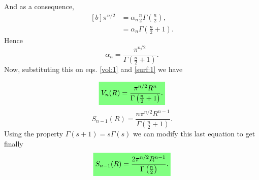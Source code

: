 \begin{questions}
\begin{solution}
\begin{equation}
  \end{equation}
  And as a consequence,
  \begin{equation}
    \begin{aligned}[b]
      \pi^{n/2} &= \alpha_n \frac{n}{2} \Gamma \left(\frac{n}{2}\right),\\
      & = \alpha_n \Gamma \left(\frac{n}{2} + 1 \right).
    \end{aligned}
  \end{equation}
  Hence
  \begin{equation}
    \alpha_n = \frac{\pi^{n/2}}{\Gamma \left(\frac{n}{2} + 1 \right)}.
  \end{equation}
  Now, substituting this on eqs. \ref{vol:1} and \ref{surf:1} we have

  \begin{equation}
    \hlgreen{V_n(R) = \frac{\pi^{n/2}R^n}{\Gamma \left(\frac{n}{2} + 1 \right)}.}
  \end{equation}
  \begin{equation}
    S_{n-1}(R) = \frac{n\pi^{n/2}R^{n-1}}{\Gamma \left(\frac{n}{2} + 1 \right)}.
  \end{equation}
  Using the property $\Gamma(s+1) = s\Gamma(s)$ we can modify this last equation to get finally
  \begin{equation}
    \hlgreen{S_{n-1}(R) = \frac{2\pi^{n/2}R^{n-1}}{\Gamma \left(\frac{n}{2}\right)}.}
  \end{equation}
 \end{solution}
\end{questions}

%
%
